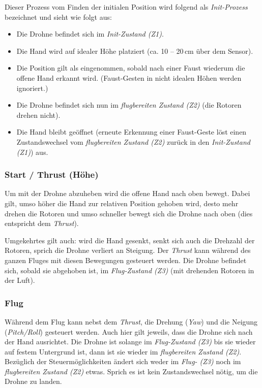 Dieser Prozess vom Finden der initialen Position wird folgend als \textit{Init-Prozess} bezeichnet und sieht wie folgt aus:

\begin{itemize}
	\item Die Drohne befindet sich im \textit{Init-Zustand (Z1)}.
	\item Die Hand wird auf idealer Höhe platziert (ca. 10 -- 20\,cm über dem Sensor).
	\item Die Position gilt als eingenommen, sobald nach einer Faust wiederum die offene Hand erkannt wird. (Faust-Gesten in nicht idealen Höhen werden ignoriert.)
	\item Die Drohne befindet sich nun im \textit{flugbereiten Zustand (Z2)} (die Rotoren drehen nicht).
	\item Die Hand bleibt geöffnet (erneute Erkennung einer Faust-Geste löst einen Zustandswechsel vom \textit{flugbereiten Zustand (Z2)} zurück in den \textit{Init-Zustand (Z1)}) aus.
\end{itemize}

\subsubsection{Start / Thrust (Höhe)}
Um mit der Drohne abzuheben wird die offene Hand nach oben bewegt. Dabei gilt, umso höher die Hand zur relativen Position gehoben wird, desto mehr drehen die Rotoren und umso schneller bewegt sich die Drohne nach oben (dies entspricht dem \textit{Thrust}).

Umgekehrtes gilt auch: wird die Hand gesenkt, senkt sich auch die Drehzahl der Rotoren, sprich die Drohne verliert an Steigung.
Der \textit{Thrust} kann während des ganzen Fluges mit diesen Bewegungen gesteuert werden.
Die Drohne befindet sich, sobald sie abgehoben ist, im \textit{Flug-Zustand (Z3)} (mit drehenden Rotoren in der Luft).

\subsubsection{Flug}
Während dem Flug kann nebst dem \textit{Thrust}, die Drehung (\textit{Yaw}) und die Neigung (\textit{Pitch/Roll}) gesteuert werden.
Auch hier gilt jeweils, dass die Drohne sich nach der Hand ausrichtet.
Die Drohne ist solange im \textit{Flug-Zustand (Z3)} bis sie wieder auf festem Untergrund ist, dann ist sie wieder im \textit{flugbereiten Zustand (Z2)}.
Bezüglich der Steuermöglichkeiten ändert sich weder im \textit{Flug- (Z3)} noch im \textit{flugbereiten Zustand (Z2)} etwas.
Sprich es ist kein Zustandswechsel nötig, um die Drohne zu landen.


